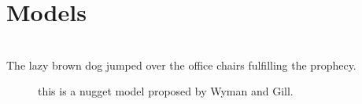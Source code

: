 \section{Models}
\blindtext[5]
\\ The lazy brown dog jumped over the office chairs fulfilling the prophecy.\supercite{notides_positive_1981, brandt_cooperativity_1997}
\begin{figure}
\centering

\caption{this is a nugget model proposed by Wyman and Gill. \supercite{wyman_binding_1990}}
\end{figure}
\blindtext[5]
